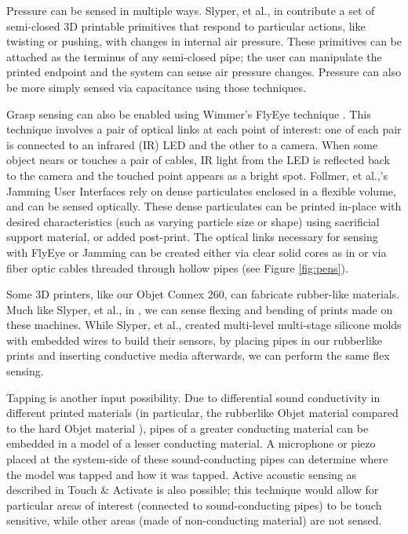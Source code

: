 Pressure can be sensed in multiple ways.  Slyper, et al., in \cite{Slyper-pressure} contribute a set of semi-closed 3D printable primitives that respond to particular actions, like twisting or pushing, with changes in internal air pressure.  These primitives can be attached as the terminus of any semi-closed pipe; the user can manipulate the printed endpoint and the system can sense air pressure changes.  Pressure can also be more simply sensed via capacitance using those techniques.

Grasp sensing can also be enabled using Wimmer's FlyEye technique \cite{Wimmer-flyeye}.  This technique involves a pair of optical links at each point of interest: one of each pair is connected to an infrared (IR) LED and the other to a camera.  When some object nears or touches a pair of cables, IR light from the LED is reflected back to the camera and the touched point appears as a bright spot.  Follmer, et al.,'s Jamming User Interfaces \cite{Follmer-jamming} rely on dense particulates enclosed in a flexible volume, and can be sensed optically.  These dense particulates can be printed in-place with desired characteristics (such as varying particle size or shape) using sacrificial support material, or added post-print.  The optical links necessary for sensing with FlyEye or Jamming can be created either via clear solid cores as in \cite{Willis-printedoptics} or via fiber optic cables threaded through hollow pipes (see Figure \ref{fig:pens}).

Some 3D printers, like our Objet Connex 260, can fabricate rubber-like materials.  Much like Slyper, et al., in \cite{Slyper-shape}, we can sense flexing and bending of prints made on these machines.  While Slyper, et al., created multi-level multi-stage silicone molds with embedded wires to build their sensors, by placing pipes in our rubberlike prints and inserting conductive media afterwards, we can perform the same flex sensing.

Tapping is another input possibility.  Due to differential sound conductivity in different printed materials (in particular, the rubberlike Objet material compared to the hard Objet material ), pipes of a greater conducting material can be embedded in a model of a lesser conducting material.  A microphone or piezo placed at the system-side of these sound-conducting pipes can determine where the model was tapped and how it was tapped.  Active acoustic sensing as described in Touch \& Activate \cite{Ono-touchandactivate} is also possible; this technique would allow for particular areas of interest (connected to sound-conducting pipes) to be touch sensitive, while other areas (made of non-conducting material) are not sensed.

